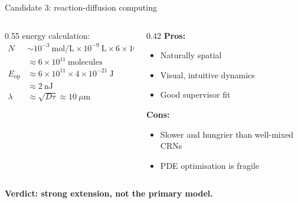 \documentclass[aspectratio=169,11pt]{beamer}
\begin{document}
\begin{frame}{Candidate 3: reaction-diffusion computing}

\begin{columns}
\begin{column}{0.55\textwidth}
energy calculation:
\begin{align*}
    N &\sim 10^{-3}\ \text{mol/L} \times 10^{-9}\ \text{L} \times 6\times10^{23} \\
      &\approx 6\times10^{11}\ \text{molecules} \\[0.3em]
    E_{\text{op}} &\approx 6\times10^{11} \times 4\times10^{-21}\ \text{J} \\
      &\approx 2\ \text{nJ} \\[0.3em]
    \lambda &\approx \sqrt{D\tau} \approx 10\ \mu\text{m}
\end{align*}
\end{column}
\begin{column}{0.42\textwidth}
\textbf{Pros:}
\begin{itemize}
    \item Naturally spatial
    \item Visual, intuitive dynamics
    \item Good supervisor fit
\end{itemize}

\vspace{0.2cm}
\textbf{Cons:}
\begin{itemize}
    \item Slower and hungrier than well-mixed CRNs
    \item PDE optimisation is fragile
\end{itemize}
\end{column}
\end{columns}

\vspace{0.4cm}
\centering
\textbf{Verdict: strong extension, not the primary model.}

\end{frame}
\end{document}
